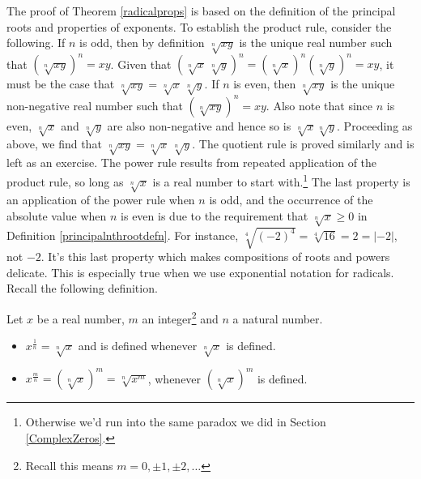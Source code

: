 \documentclass[12pt]{ximera}
\begin{document}

\medskip

The proof of Theorem \ref{radicalprops} is based on the definition of the principal roots and properties of exponents. To establish the product rule, consider the following.  If $n$ is odd, then by definition $\sqrt[n]{xy}$ is the unique real number such that $(\sqrt[n]{xy})^{n} = xy$.  Given that $\left( \sqrt[n]{x} \, \sqrt[n]{y}\right)^n = \left(\sqrt[n]{x}\right)^n \left(\sqrt[n]{y}\right)^n = xy$, it must be the case that $\sqrt[n]{xy} = \sqrt[n]{x} \, \sqrt[n]{y}$. If $n$ is even, then $\sqrt[n]{xy}$ is the unique non-negative real number such that $(\sqrt[n]{xy})^{n} = xy$.  Also note that since $n$ is even, $\sqrt[n]{x}$ and $\sqrt[n]{y}$ are also non-negative and hence so is $\sqrt[n]{x}\sqrt[n]{y}$.  Proceeding as above, we find that $\sqrt[n]{xy} = \sqrt[n]{x} \, \sqrt[n]{y}$.  The quotient rule is proved similarly and is left as an exercise.  The power rule results from repeated application of the product rule, so long as $\sqrt[n]{x}$ is a real number to start with.\footnote{Otherwise we'd run into the same paradox we did in Section \ref{ComplexZeros}.}  The last property is an application of the power rule when $n$ is odd, and the occurrence of the absolute value when $n$ is even is due to the requirement that  $\sqrt[n]{x} \geq 0$ in Definition \ref{principalnthrootdefn}. For instance, $\sqrt[4]{(-2)^4} = \sqrt[4]{16}= 2 =  |-2|$, not $-2$.   It's this last property which makes compositions of roots and powers delicate.  This is especially true when we use exponential notation for radicals.  Recall the following definition.

\smallskip


\begin{definition}  \label{rationalexponentdefn} Let $x$ be a real number,  $m$ an integer\footnote{Recall this means $m = 0, \pm 1, \pm 2, \ldots$} and $n$ a natural number. 

\begin{itemize}

\item  $x^{\frac{1}{n}} = \sqrt[n]{x}$ and is defined whenever $\sqrt[n]{x}$ is defined.

\item  $x^{\frac{m}{n}}  = \left(\sqrt[n]{x}\right)^m = \sqrt[n]{x^m}$, whenever $\left(\sqrt[n]{x}\right)^{m}$ is defined.

\end{itemize}
\end{definition}
\end{document}
